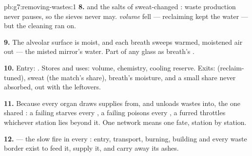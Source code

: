 \begin{solution}{pb:g7:removing-wastes:1}
\textbf{8.}  and the salts of sweat-changed :
waste production never pauses, so the sieves never may.
 \emph{volume} fell --- reclaiming kept the water
--- but the cleaning ran on.

\textbf{9.} The alveolar surface is moist, and each
breath sweeps warmed, moistened air out --- the misted
mirror's water. Part of any glass  as breath's
.

\textbf{10.} Entry: . Stores and uses: 
volume,  chemistry, cooling reserve. Exits: 
(reclaim-tuned), sweat (the match's share), breath's
moisture, and a small share never absorbed, out with the
leftovers.

\textbf{11.} Because every organ draws supplies from,
and unloads wastes into, the one shared : a failing
 starves every , a failing  poisons
every , a furred  throttles whichever station
lies beyond it. One network means one fate, station by
station.

\textbf{12.}  --- the slow fire in every
: entry, transport, burning, building and every
waste border exist to feed it, supply it, and carry away
its ashes.
\end{solution}
